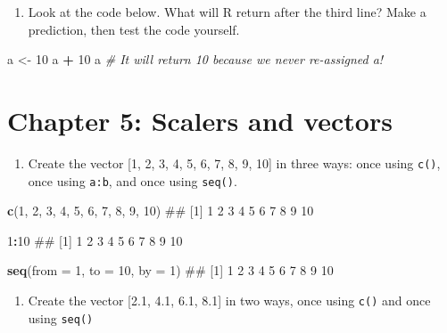 \documentclass[]{book}
\newenvironment{Shaded}{\begin{snugshade}}{\end{snugshade}}
\newcommand{\KeywordTok}[1]{\textcolor[rgb]{0.13,0.29,0.53}{\textbf{#1}}}
\newcommand{\DataTypeTok}[1]{\textcolor[rgb]{0.13,0.29,0.53}{#1}}
\newcommand{\DecValTok}[1]{\textcolor[rgb]{0.00,0.00,0.81}{#1}}
\newcommand{\StringTok}[1]{\textcolor[rgb]{0.31,0.60,0.02}{#1}}
\newcommand{\CommentTok}[1]{\textcolor[rgb]{0.56,0.35,0.01}{\textit{#1}}}
\newcommand{\OperatorTok}[1]{\textcolor[rgb]{0.81,0.36,0.00}{\textbf{#1}}}
\newcommand{\NormalTok}[1]{#1}
\providecommand{\tightlist}{%
  \setlength{\itemsep}{0pt}\setlength{\parskip}{0pt}}
\theoremstyle{definition}
\theoremstyle{definition}
\theoremstyle{remark}
\begin{document}
\begin{enumerate}
\def\labelenumi{\arabic{enumi}.}
\setcounter{enumi}{4}
\tightlist
\item
  Look at the code below. What will R return after the third line? Make
  a prediction, then test the code yourself.
\end{enumerate}

\begin{Shaded}
\begin{Highlighting}[]
\NormalTok{a <-}\StringTok{ }\DecValTok{10}
\NormalTok{a }\OperatorTok{+}\StringTok{ }\DecValTok{10}
\NormalTok{a       }\CommentTok{# It will return 10 because we never re-assigned a!}
\end{Highlighting}
\end{Shaded}

\section{Chapter 5: Scalers and
vectors}\label{chapter-5-scalers-and-vectors}

\begin{enumerate}
\def\labelenumi{\arabic{enumi}.}
\tightlist
\item
  Create the vector {[}1, 2, 3, 4, 5, 6, 7, 8, 9, 10{]} in three ways:
  once using \texttt{c()}, once using \texttt{a:b}, and once using
  \texttt{seq()}.
\end{enumerate}

\begin{Shaded}
\begin{Highlighting}[]
\KeywordTok{c}\NormalTok{(}\DecValTok{1}\NormalTok{, }\DecValTok{2}\NormalTok{, }\DecValTok{3}\NormalTok{, }\DecValTok{4}\NormalTok{, }\DecValTok{5}\NormalTok{, }\DecValTok{6}\NormalTok{, }\DecValTok{7}\NormalTok{, }\DecValTok{8}\NormalTok{, }\DecValTok{9}\NormalTok{, }\DecValTok{10}\NormalTok{)}
\NormalTok{##  [1]  1  2  3  4  5  6  7  8  9 10}

\DecValTok{1}\OperatorTok{:}\DecValTok{10}
\NormalTok{##  [1]  1  2  3  4  5  6  7  8  9 10}

\KeywordTok{seq}\NormalTok{(}\DataTypeTok{from =} \DecValTok{1}\NormalTok{, }\DataTypeTok{to =} \DecValTok{10}\NormalTok{, }\DataTypeTok{by =} \DecValTok{1}\NormalTok{)}
\NormalTok{##  [1]  1  2  3  4  5  6  7  8  9 10}
\end{Highlighting}
\end{Shaded}

\begin{enumerate}
\def\labelenumi{\arabic{enumi}.}
\setcounter{enumi}{1}
\tightlist
\item
  Create the vector {[}2.1, 4.1, 6.1, 8.1{]} in two ways, once using
  \texttt{c()} and once using \texttt{seq()}
\end{enumerate}
\end{document}
